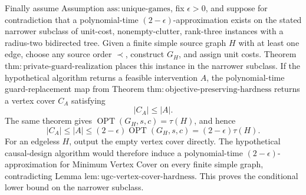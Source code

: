 Finally assume Assumption \(\mathrm{ass{:}unique\mbox{-}games}\), fix \(\epsilon>0\), and suppose for contradiction that a polynomial-time \((2-\epsilon)\)-approximation exists on the stated narrower subclass of unit-cost, nonempty-clutter, rank-three instances with a radius-two bidirected tree.  Given a finite simple source graph \(H\) with at least one edge, choose any source order \(\prec\), construct \(G_H\), and assign unit costs.  Theorem \(\mathrm{thm{:}private\mbox{-}guard\mbox{-}realization}\) places this instance in the narrower subclass.  If the hypothetical algorithm returns a feasible intervention \(A\), the polynomial-time guard-replacement map from Theorem \(\mathrm{thm{:}objective\mbox{-}preserving\mbox{-}hardness}\) returns a vertex cover \(C_A\) satisfying
\[
 |C_A|\leq|A|.
\]
The same theorem gives \(\operatorname{OPT}(G_H,s,c)=\tau(H)\), and hence
\[
 |C_A|
 \leq|A|
 \leq(2-\epsilon)\operatorname{OPT}(G_H,s,c)
 =(2-\epsilon)\tau(H).
\]
For an edgeless \(H\), output the empty vertex cover directly.  The hypothetical causal-design algorithm would therefore induce a polynomial-time \((2-\epsilon)\)-approximation for Minimum Vertex Cover on every finite simple graph, contradicting Lemma \(\mathrm{lem{:}ugc\mbox{-}vertex\mbox{-}cover\mbox{-}hardness}\).  This proves the conditional lower bound on the narrower subclass.
